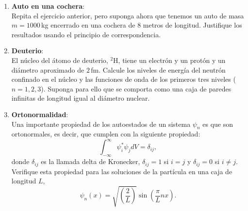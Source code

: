 \documentclass[a4paper,12pt]{article}
\begin{document}
\begin{enumerate}
\item {\bf{Auto en una cochera}}:\\
	Repita el ejercicio anterior, pero suponga ahora que tenemos un auto de
	masa $m=1000$\,kg encerrado en una cochera de 8 metros de longitud.
	Justifique los resultados usando el principio de correspondencia.

\item {\bf{Deuterio}}:\\
	El núcleo del átomo de deuterio, $^2$H, tiene un electrón y un protón y un
	diámetro aproximado de $2$\,fm. Calcule los niveles de energía del neutrón
	confinado en el núcleo y las funciones de onda de los primeros tres niveles
	($n=1,2,3$). Suponga para ello que se comporta como una caja de paredes
	infinitas de longitud igual al diámetro nuclear.  

\item {\bf{Ortonormalidad}}:\\
	Una importante propiedad de los autoestados de un sistema $\psi_n$ es que
	son ortonormales, es decir, que cumplen con la siguiente propiedad: 
	$$ \int_{-\infty}^{\infty} \psi_i^* \psi_j dV = \delta_{ij},$$
	donde $\delta_{ij}$ es la llamada delta de Kronecker, $\delta_{ij}=1$ si
	$i=j$ y $\delta_{ij}=0$ si $i\neq j$. Verifique esta propiedad para las
	soluciones de la partícula en una caja de longitud $L$, $$\psi_n(x) =
	\sqrt{\left( \frac{2}{L} \right)} \sin \left (\frac{\pi}{L} n x \right ).$$
\end{enumerate}
\end{document}
